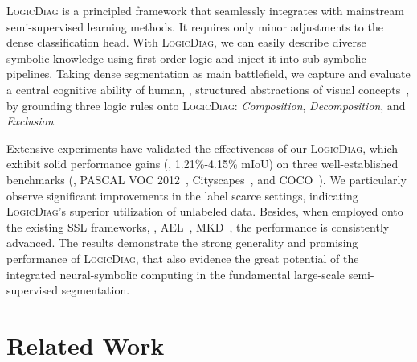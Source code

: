 \documentclass[10pt,twocolumn,letterpaper]{article}
\def\Ours{{\textsc{LogicDiag}}}
\begin{document}
{\Ours} is a principled framework that seamlessly integrates with mainstream semi-supervised learning methods. It requires only minor adjustments to the dense classification head. 
With {\Ours}, we can easily describe diverse symbolic knowledge using first-order logic and inject it into sub-symbolic pipelines.
Taking dense segmentation as main battlefield, we capture and evaluate a central cognitive ability of human, \ie, structured abstractions of visual concepts~\cite{bill2020hierarchical}, by grounding three logic rules onto {\Ours}:
\textit{Composition}, \textit{Decomposition}, and \textit{Exclusion}.


Extensive experiments have validated the effectiveness of our {\Ours}, which exhibit solid performance gains (\ie, 1.21\%-4.15\% mIoU) on three well-established benchmarks (\ie, PASCAL VOC 2012~\cite{everingham2015pascal}, Cityscapes~\cite{cordts2016cityscapes}, and COCO~\cite{lin2014microsoft}). We particularly observe significant improvements in the label scarce settings, indicating {\Ours}'s superior utilization of unlabeled data.
Besides, when employed onto the existing SSL frameworks, \eg, AEL~\cite{hu2021semi}, MKD~\cite{yuan2022semi}, the performance is consistently advanced.
The results demonstrate the strong generality and promising performance of {\Ours}, that also evidence the great potential of the integrated neural-symbolic computing in the fundamental large-scale semi-supervised segmentation.


\vspace{-5pt}
\section{Related Work}\label{sec:related}
\vspace{-3pt}
\end{document}
